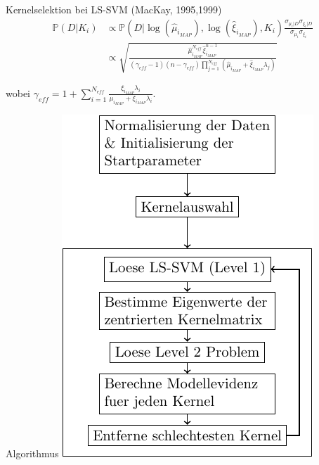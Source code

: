 \documentclass{beamer}
\begin{document}
{\begin{frame}
\begin{block}{Kernelselektion bei LS-SVM (MacKay, 1995,1999)}
\begin{align}
\mathbb{P}(D \vert K_i) & \propto \mathbb{P}(D \vert \log(\hat{\mu}_{i_{MAP}}), \log(\hat{\xi}_{i_{MAP}}), K_i)\frac{\sigma_{\mu_i\vert D} \sigma_{\xi_i\vert D}}{\sigma_{\mu_i} \sigma_{\xi_i}}\\
&\propto \sqrt{\frac{\hat{\mu}^{N_{eff}}_{i_{MAP}} \hat{\xi}^{n-1}_{i_{MAP}}}{(\gamma_{eff}-1)(n - \gamma_{eff}) \prod_{j=1}^{N_{eff}}(\hat{\mu}_{i_{MAP}} + \hat{\xi}_{i_{MAP}}\lambda_j)}}
\end{align}

wobei $\gamma_{eff} = 1 + \sum_{i=1}^{N_{eff}}\frac{\xi_{i_{MAP}}\lambda_i}{\mu_{i_{MAP}} + \xi_{i_{MAP}}\lambda_i}$.

\end{block}

\end{frame}






\begin{frame}{Algorithmus}
	\centering\includegraphics[scale=0.9]{Algo.pdf}
\end{frame}



}
\end{document}
